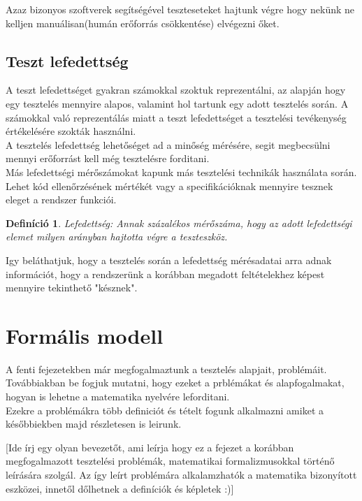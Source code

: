 \documentclass[12pt]{article}
\newtheorem{defin}{Definíció}[section]
\begin{document}
Azaz bizonyos szoftverek segítségével teszteseteket hajtunk végre hogy nekünk ne kelljen manuálisan(humán erőforrás csökkentése) elvégezni őket. 

\subsection{Teszt lefedettség}

A teszt lefedettséget gyakran számokkal szoktuk reprezentálni, az alapján hogy egy tesztelés mennyire alapos, valamint hol tartunk egy adott tesztelés során. A számokkal való reprezentálás miatt a teszt lefedettséget a tesztelési tevékenység értékelésére szokták használni.\\
A tesztelés lefedettség lehetőséget ad a minőség mérésére, segit megbecsülni mennyi erőforrást kell még tesztelésre forditani.\\
Más lefedettségi mérőszámokat kapunk más tesztelési technikák használata során. Lehet kód ellenőrzésének mértékét vagy a specifikációknak mennyire tesznek eleget a rendszer funkciói.\\

\begin{defin}
Lefedettség: Annak százalékos mérőszáma, hogy az adott lefedettségi elemet milyen arányban hajtotta végre a teszteszköz. ~\cite{htb:masterfield}
\end{defin}

Igy beláthatjuk, hogy a tesztelés során a lefedettség mérésadatai arra adnak információt, hogy a rendszerünk a korábban megadott feltételekhez képest mennyire tekinthető "késznek".

\section{Formális modell}

A fenti fejezetekben már megfogalmaztunk a tesztelés alapjait, problémáit. Továbbiakban be fogjuk mutatni, hogy ezeket a prblémákat és alapfogalmakat, hogyan is lehetne a matematika nyelvére leforditani.\\
Ezekre a problémákra több definiciót és tételt fogunk alkalmazni amiket a későbbiekben majd részletesen is leirunk.  

[Ide írj egy olyan bevezetőt, ami leírja hogy ez a fejezet a korábban megfogalmazott tesztelési problémák, matematikai formalizmusokkal történő leírására szolgál. Az így leírt problémára alkalamzhatók a matematika bizonyított eszközei, innetől dőlhetnek a definíciók és képletek :)]
\end{document}
